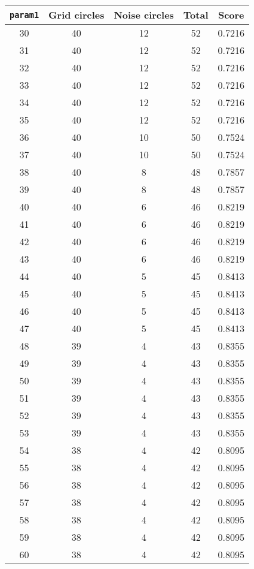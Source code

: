 \documentclass[letterpaper, 12pt]{article}
\begin{document}
\begin{longtable}{|c|c|c|c|c|}
\hline
\textbf{\texttt{param1}} & \textbf{Grid circles} & \textbf{Noise circles} & \textbf{Total} & \textbf{Score} \\
\hline
30 & 40 & 12 & 52 & 0.7216 \\
\hline
31 & 40 & 12 & 52 & 0.7216 \\
\hline
32 & 40 & 12 & 52 & 0.7216 \\
\hline
33 & 40 & 12 & 52 & 0.7216 \\
\hline
34 & 40 & 12 & 52 & 0.7216 \\
\hline
35 & 40 & 12 & 52 & 0.7216 \\
\hline
36 & 40 & 10 & 50 & 0.7524 \\
\hline
37 & 40 & 10 & 50 & 0.7524 \\
\hline
38 & 40 & 8 & 48 & 0.7857 \\
\hline
39 & 40 & 8 & 48 & 0.7857 \\
\hline
40 & 40 & 6 & 46 & 0.8219 \\
\hline
41 & 40 & 6 & 46 & 0.8219 \\
\hline
42 & 40 & 6 & 46 & 0.8219 \\
\hline
43 & 40 & 6 & 46 & 0.8219 \\
\hline
44 & 40 & 5 & 45 & 0.8413 \\
\hline
45 & 40 & 5 & 45 & 0.8413 \\
\hline
46 & 40 & 5 & 45 & 0.8413 \\
\hline
47 & 40 & 5 & 45 & 0.8413 \\
\hline
48 & 39 & 4 & 43 & 0.8355 \\
\hline
49 & 39 & 4 & 43 & 0.8355 \\
\hline
50 & 39 & 4 & 43 & 0.8355 \\
\hline
51 & 39 & 4 & 43 & 0.8355 \\
\hline
52 & 39 & 4 & 43 & 0.8355 \\
\hline
53 & 39 & 4 & 43 & 0.8355 \\
\hline
54 & 38 & 4 & 42 & 0.8095 \\
\hline
55 & 38 & 4 & 42 & 0.8095 \\
\hline
56 & 38 & 4 & 42 & 0.8095 \\
\hline
57 & 38 & 4 & 42 & 0.8095 \\
\hline
58 & 38 & 4 & 42 & 0.8095 \\
\hline
59 & 38 & 4 & 42 & 0.8095 \\
\hline
60 & 38 & 4 & 42 & 0.8095 \\
\hline

\end{longtable}
\end{document}
